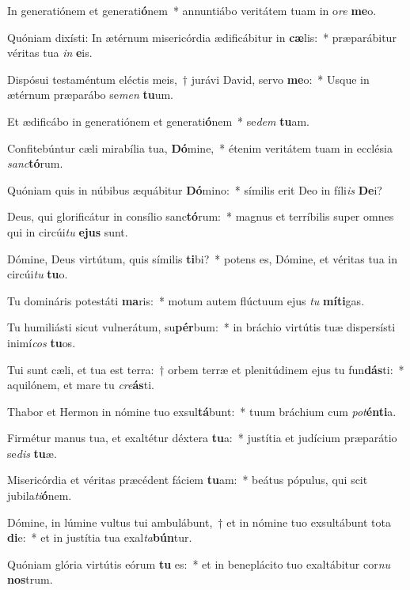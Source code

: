 \item In generatiónem et generati\textbf{ó}nem~* annuntiábo veritátem tuam in o\textit{re} \textbf{me}o.
\item Quóniam dixísti: In ætérnum misericórdia ædificábitur in \textbf{cæ}lis:~* præparábitur véritas tua \textit{in} \textbf{e}is.
\item Dispósui testaméntum eléctis meis,~† jurávi David, servo \textbf{me}o:~* Usque in ætérnum præparábo se\textit{men} \textbf{tu}um.
\item Et ædificábo in generatiónem et generati\textbf{ó}nem~* se\textit{dem} \textbf{tu}am.
\item Confitebúntur cæli mirabília tua, \textbf{Dó}mine,~* étenim veritátem tuam in ecclésia \textit{sanc}\textbf{tó}rum.
\item Quóniam quis in núbibus æquábitur \textbf{Dó}mino:~* símilis erit Deo in fíli\textit{is} \textbf{De}i?
\item Deus, qui glorificátur in consílio sanc\textbf{tó}rum:~* magnus et terríbilis super omnes qui in circúi\textit{tu} \textbf{e}\textbf{jus} sunt.
\item Dómine, Deus virtútum, quis símilis \textbf{ti}bi?~* potens es, Dómine, et véritas tua in circúi\textit{tu} \textbf{tu}o.
\item Tu domináris potestáti \textbf{ma}ris:~* motum autem flúctuum ejus \textit{tu} \textbf{mí}\textbf{ti}gas.
\item Tu humiliásti sicut vulnerátum, su\textbf{pér}bum:~* in bráchio virtútis tuæ dispersísti inimí\textit{cos} \textbf{tu}os.
\item Tui sunt cæli, et tua est terra:~† orbem terræ et plenitúdinem ejus tu fun\textbf{dás}ti:~* aquilónem, et mare tu \textit{cre}\textbf{ás}ti.
\item Thabor et Hermon in nómine tuo exsul\textbf{tá}bunt:~* tuum bráchium cum \textit{pot}\textbf{én}\textbf{ti}a.
\item Firmétur manus tua, et exaltétur déxtera \textbf{tu}a:~* justítia et judícium præparátio se\textit{dis} \textbf{tu}æ.
\item Misericórdia et véritas præcédent fáciem \textbf{tu}am:~* beátus pópulus, qui scit jubila\textit{ti}\textbf{ó}nem.
\item Dómine, in lúmine vultus tui ambulábunt,~† et in nómine tuo exsultábunt tota \textbf{di}e:~* et in justítia tua exal\textit{ta}\textbf{bún}tur.
\item Quóniam glória virtútis eórum \textbf{tu} es:~* et in beneplácito tuo exaltábitur cor\textit{nu} \textbf{nos}trum.
